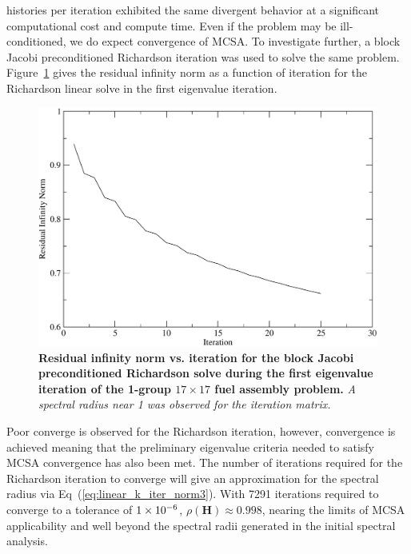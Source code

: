  histories per iteration exhibited the same divergent
behavior at a significant computational cost and compute time. Even if
the problem may be ill-conditioned, we do expect convergence of
MCSA. To investigate further, a block Jacobi preconditioned Richardson
iteration was used to solve the same
problem. Figure~\ref{fig:block_jacobi_res_richardson} gives the
residual infinity norm as a function of iteration for the Richardson
linear solve in the first eigenvalue iteration.
\begin{figure}[t!]
  \begin{center}
    \includegraphics[width=5in]{chapters/spn_equations/block_jacobi_rich_res.pdf}
  \end{center}
  \caption{\textbf{Residual infinity norm vs. iteration for the block
      Jacobi preconditioned Richardson solve during the first
      eigenvalue iteration of the 1-group $17 \times 17$ fuel assembly
      problem.} \textit{A spectral radius near 1 was observed for the
      iteration matrix.}}
  \label{fig:block_jacobi_res_richardson}
\end{figure}
Poor converge is observed for the Richardson iteration, however,
convergence is achieved meaning that the preliminary eigenvalue
criteria needed to satisfy MCSA convergence has also been met. The
number of iterations required for the Richardson iteration to converge
will give an approximation for the spectral radius via
Eq~(\ref{eq:linear_k_iter_norm3}). With 7291 iterations required to
converge to a tolerance of $1\times 10^{-6}$, $\rho(\mathbf{H}) \approx
0.998$, nearing the limits of MCSA applicability and well beyond the
spectral radii generated in the initial spectral analysis.

